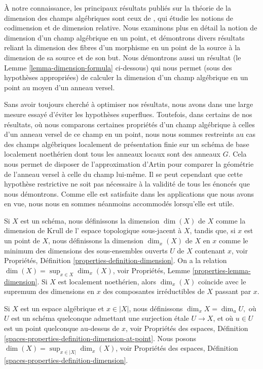 \noindent
À notre connaissance, les principaux résultats publiés sur la théorie de la
dimension des champs algébriques sont ceux de \cite{Osserman}, qui
étudie les notions de codimension et de dimension relative. Nous
examinons plus en détail la notion de dimension d'un
champ algébrique en un point, et démontrons divers résultats
reliant la dimension des fibres d'un morphisme en un point de la source
à la dimension de sa source et de son but. Nous démontrons aussi un résultat
(le Lemme \ref{lemma-dimension-formula} ci-dessous) qui
nous permet (sous des hypothèses appropriées) de calculer la dimension
d'un champ algébrique en un point au moyen d'un anneau versel.

\medskip\noindent
Sans avoir toujours cherché à optimiser nos résultats, nous avons
dans une large mesure essayé d'éviter les hypothèses superflues. Toutefois, dans certains
de nos résultats, où nous comparons certaines propriétés d'un champ
algébrique à celles d'un anneau versel de ce
champ en un point, nous nous sommes restreints
au cas des champs algébriques localement de présentation finie
sur un schéma de base localement noethérien dont tous les anneaux locaux sont
des anneaux $G$. Cela nous permet de disposer de l'approximation d'Artin
pour comparer la géométrie de l'anneau versel à celle
du champ lui-même. Il se peut cependant que cette hypothèse restrictive
ne soit pas nécessaire à la validité
de tous les énoncés que nous démontrons.
Comme elle est satisfaite dans les applications que nous avons en vue,
nous nous en sommes néanmoins accommodés lorsqu'elle est utile.

\medskip\noindent
Si $X$ est un schéma, nous définissons la dimension $\dim(X)$ de $X$
comme la dimension de Krull de l'
espace topologique sous-jacent à $X$,
tandis que, si $x$ est un point de $X$,
nous définissons la dimension $\dim_x (X)$ de $X$ en $x$ comme le
minimum des dimensions des sous-ensembles ouverts $U$ de $X$ contenant
$x$, voir
Propriétés, Définition \ref{properties-definition-dimension}.
On a la relation $\dim(X) = \sup_{x \in X} \dim_x(X)$, voir
Propriétés, Lemme \ref{properties-lemma-dimension}.
Si $X$ est localement noethérien, alors $\dim_x(X)$ coïncide avec le supremum
des dimensions en $x$
des composantes irréductibles de $X$ passant par $x$.

\medskip\noindent
Si $X$ est un espace algébrique et $x \in |X|$,
nous définissons $\dim_x X = \dim_u U,$ où $U$ est un schéma quelconque
admettant une surjection étale $U \to X$,
et où $u\in U$ est un point quelconque au-dessus de $x$, voir
Propriétés des espaces, Définition
\ref{spaces-properties-definition-dimension-at-point}.
Nous posons $\dim(X) = \sup_{x \in |X|} \dim_x(X)$, voir
Propriétés des espaces, Définition \ref{spaces-properties-definition-dimension}.

